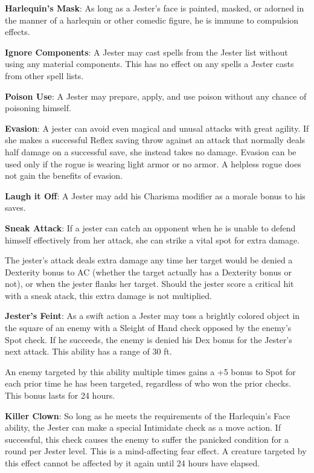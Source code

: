 \textbf{Harlequin's Mask}: As long as a Jester’s face is painted, masked, or adorned in the manner of a harlequin or other comedic figure, he is immune to compulsion effects.

\textbf{Ignore Components}: A Jester may cast spells from the Jester list without using any material components. This has no effect on any spells a Jester casts from other spell lists.

\textbf{Poison Use}: A Jester may prepare, apply, and use poison without any chance of poisoning himself.

\textbf{Evasion}: A jester can avoid even magical and unusal attacks with great agility. If she makes a successful Reflex saving throw against an attack that normally deals half damage on a successful save, she instead takes no damage. Evasion can be used only if the rogue is wearing light armor or no armor. A helpless rogue does not gain the benefits of evasion.

\textbf{Laugh it Off}: A Jester may add his Charisma modifier as a morale bonus to his saves.

\textbf{Sneak Attack}: If a jester can catch an opponent when he is unable to defend himself effectively from her attack, she can strike a vital spot for extra damage. 

The jester's attack deals extra damage any time her target would be denied a Dexterity bonus to AC (whether the target actually has a Dexterity bonus or not), or when the jester flanks her target. Should the jester score a critical hit with a sneak atack, this extra damage is not multiplied. 

\textbf{Jester's Feint}: As a swift action a Jester may toss a brightly colored object in the square of an enemy with a Sleight of Hand check opposed by the enemy’s Spot check. If he succeeds, the enemy is denied his Dex bonus for the Jester’s next attack. This ability has a range of 30 ft.

An enemy targeted by this ability multiple times gains a +5 bonus to Spot for each prior time he has been targeted, regardless of who won the prior checks. This bonus lasts for 24 hours.

\textbf{Killer Clown}: So long as he meets the requirements of the Harlequin’s Face ability, the Jester can make a special Intimidate check as a move action. If successful, this check causes the enemy to suffer the panicked condition for a round per Jester level. This is a mind-affecting fear effect. A creature targeted by this effect cannot be affected by it again until 24 hours have elapsed.


